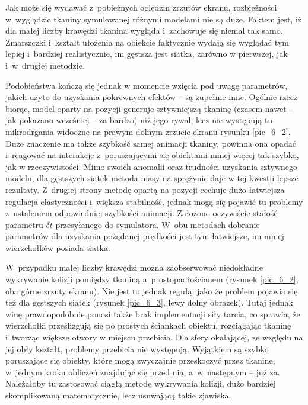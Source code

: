 			
		
		\pagebreak
		
		
		Jak może się wydawać z~pobieżnych oględzin zrzutów ekranu, rozbieżności w~wyglądzie tkaniny symulowanej różnymi modelami nie są duże. Faktem jest, iż dla małej liczby krawędzi tkanina wygląda i~zachowuje się niemal tak samo. Zmarszczki i~kształt ułożenia na obiekcie faktycznie wydają się wyglądać tym lepiej i~bardziej realistycznie, im gęstsza jest siatka, zarówno w pierwszej, jak i~w~drugiej metodzie. 
		
		Podobieństwa kończą się jednak w momencie wzięcia pod uwagę parametrów, jakich użyto do uzyskania pokrewnych efektów -- są zupełnie inne. Ogólnie rzecz biorąc, model oparty na pozycji generuje sztywniejszą tkaninę (czasem nawet -- jak pokazano wcześniej -- za bardzo) niż jego rywal, lecz nie występują tu mikrodrgania widoczne na prawym dolnym zrzucie ekranu rysunku \ref{pic_6_2}. Duże znaczenie ma także szybkość samej animacji tkaniny, powinna ona opadać i~reagować na interakcje z~poruszającymi się obiektami mniej więcej tak szybko, jak w rzeczywistości. Mimo swoich anomalii oraz trudności uzyskania sztywnego modelu, dla gęstszych siatek metoda masy na sprężynie daje w tej kwestii lepsze rezultaty. Z~drugiej strony metodę opartą na pozycji cechuje dużo łatwiejsza regulacja elastyczności i~większa stabilność, jednak mogą się pojawić tu problemy z~ustaleniem odpowiedniej szybkości animacji. Założono oczywiście stałość parametru \(\delta t \) przesyłanego do symulatora. W~obu metodach dobranie parametrów dla uzyskania pożądanej prędkości jest tym łatwiejsze, im mniej wierzchołków posiada siatka.
		
		W~przypadku małej liczby krawędzi można zaobserwować niedokładne wykrywanie kolizji pomiędzy tkaniną a~prostopadłościanem (rysunek \ref{pic_6_2}, oba górne zrzuty ekranu). Nie jest to jednak regułą, jako że problem pojawia się też dla gęstszych siatek (rysunek \ref{pic_6_3}, lewy dolny obrazek). Tutaj jednak winę prawdopodobnie ponosi także brak implementacji siły tarcia, co sprawia, że wierzchołki prześlizgują się po prostych ściankach obiektu, rozciągając tkaninę i~tworząc większe otwory w miejscu przebicia. Dla sfery okalającej, ze względu na jej obły kształt, problemy przebicia nie występują. Wyjątkiem są szybko poruszające się obiekty, które mogą zwyczajnie przeskoczyć przez tkaninę, w~jednym kroku obliczeń znajdując się przed nią, a~w~następnym -- już za. Należałoby tu zastosować ciągłą metodę wykrywania kolizji, dużo bardziej skomplikowaną matematycznie, lecz usuwającą takie zjawiska.
		
